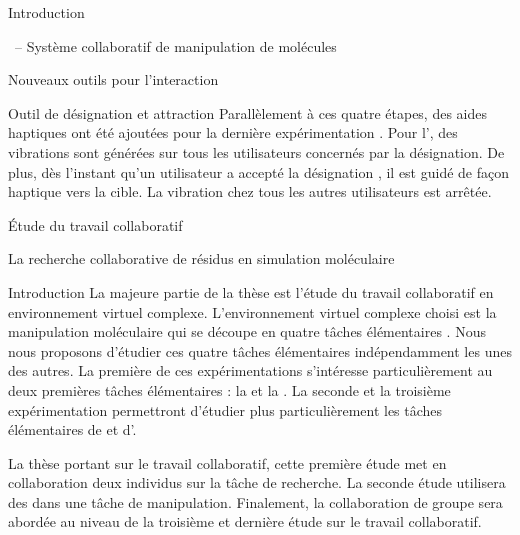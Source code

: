 \documentclass[myfrancais]{mythesis}
\begin{document}
\begin{mypart}{Introduction}
\begin{mychapter}{\myShaddock\ -- Système collaboratif de manipulation de molécules}
\begin{mysection}{Nouveaux outils pour l'interaction}
\begin{mysubsection}{Outil de désignation et attraction}
					Parallèlement à ces quatre étapes, des aides haptiques ont été ajoutées pour la dernière expérimentation .
					Pour l', des vibrations sont générées sur tous les utilisateurs concernés par la désignation.
					De plus, dès l'instant qu'un utilisateur a accepté la désignation , il est guidé de façon haptique vers la cible.
					La vibration chez tous les autres utilisateurs est arrêtée.
				\end{mysubsection}
			\end{mysection}
		\end{mychapter}
	\end{mypart}
	\begin{mypart}{Étude du travail collaboratif}
		\begin{mychapter}{La recherche collaborative de résidus en simulation moléculaire}
			\begin{mysection}{Introduction}
				La majeure partie de la thèse est l'étude du travail collaboratif en environnement virtuel complexe.
				L'environnement virtuel complexe choisi est la manipulation moléculaire qui se découpe en quatre tâches élémentaires .
				Nous nous proposons d'étudier ces quatre tâches élémentaires indépendamment les unes des autres.
				La première de ces expérimentations s'intéresse particulièrement au deux premières tâches élémentaires : la  et la .
				La seconde et la troisième expérimentation permettront d'étudier plus particulièrement les tâches élémentaires de  et d'.

				La thèse portant sur le travail collaboratif, cette première étude met en collaboration deux individus sur la tâche de recherche.
				La seconde étude utilisera des  dans une tâche de manipulation.
				Finalement, la collaboration de groupe sera abordée au niveau de la troisième et dernière étude sur le travail collaboratif.


\end{mysection}
\end{mychapter}
\end{mypart}
\end{document}
